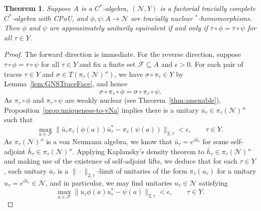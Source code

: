 \documentclass[a4paper,11pt]{amsart}
\newtheorem{theorem}{Theorem}
\theoremstyle{definition}
\numberwithin{equation}{section}
\numberwithin{theorem}{section}
\begin{document}
\begin{theorem}
	\label{thm:uniqueness}
	Suppose $A$ is a $C^*$-algebra, $(\mathcal N, Y)$ is a factorial tracially complete $C^*$-algebra with CPoU, and  $\phi, \psi \colon A \rightarrow \mathcal N$ are tracially nuclear $^*$-homomorphisms.  Then $\phi$ and $\psi$ are approximately unitarily equivalent if and only if $\tau \circ \phi = \tau \circ \psi$ for all $\tau \in Y$.
\end{theorem}

\begin{proof}
	The forward direction is immediate.  For the reverse direction, suppose $\tau \circ \phi = \tau \circ \psi$ for all $\tau \in Y$ and fix a finite set $\mathcal F \subseteq A$ and $\epsilon > 0$.  For each pair of traces $\tau \in Y$ and $\sigma \in T(\pi_\tau(\mathcal N)'')$, we have $\sigma \circ \pi_\tau \in Y$ by Lemma~\ref{lem:GNSTraceFace}, and hence 
	\begin{equation}
		\sigma \circ \pi_\tau \circ \phi = \sigma \circ \pi_\tau \circ \psi.
	\end{equation}
	As $\pi_\tau \circ \phi$ and $\pi_\tau \circ \psi$ are weakly nuclear (see Theorem~\ref{thm:amenable}), Proposition~\ref{prop:uniqueness-to-vNa} implies there is a unitary $\bar u_\tau \in \pi_\tau(\mathcal N)''$ such that 
	\begin{equation}
		\max_{a \in \mathcal F} \|\bar u_\tau \pi_\tau(\phi(a)) \bar u_\tau^* - \pi_\tau (\psi(a)) \|_{2, \tau} < \epsilon, \qquad \tau \in Y.
	\end{equation}
	As $\pi_\tau(\mathcal N)''$ is a von Neumann algebra, we know that $\bar u_\tau = e^{i\bar{h}_{\tau}}$ for some self-adjoint $\bar{h}_{\tau} \in \pi_\tau(\mathcal N)''$. Applying Kaplansky's density theorem to $\bar{h}_{\tau} \in \pi_\tau(\mathcal N)''$ and making use of the existence of self-adjoint lifts, we deduce that for each $\tau \in Y$, each unitary $\bar u_\tau$ is a $\|\cdot\|_{2, \tau}$-limit of unitaries of the form $\pi_\tau(u_\tau)$ for a unitary $u_\tau = e^{ih_\tau} \in \mathcal N$, and in particular, we may find unitaries $u_\tau \in \mathcal N$ satisfying
	\begin{equation}
		\max_{a \in \mathcal F} \| u_\tau \phi(a) u_\tau^* - \psi(a)\|_{2, \tau} < \epsilon, \qquad \tau \in Y.
	\end{equation}


\end{proof}
\end{document}

